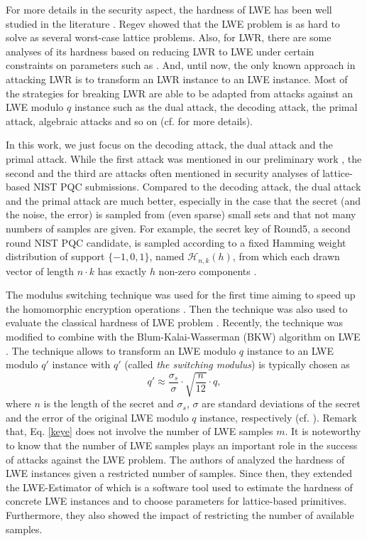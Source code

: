 \documentclass{cta-author}
\begin{document}
For more details in the security aspect, the hardness of LWE has been well studied in the literature \cite{Reg09, APS15, BLP+13}. Regev \cite{Reg09} showed that the LWE problem is as hard to solve as several worst-case lattice problems. Also, for LWR, there are some analyses of its hardness based on reducing LWR to LWE under certain constraints on parameters such as \cite{BPR12, AKPW13, BGM+15, AA16}. And, until now, the only known approach in attacking LWR is to transform an LWR instance to an LWE instance. Most of the strategies for breaking LWR are able to be adapted from attacks against an LWE modulo $q$ instance  \cite{BBGM+19, DTV15} such as the dual attack, the decoding attack, the primal attack, algebraic attacks \cite{AG11} and so on (cf. \cite{APS15} for more details). 

In this work, we just focus on the decoding attack, the dual attack and the primal attack. While the first attack was mentioned in our preliminary work \cite{LMDY18}, the second and the third are attacks often mentioned in security analyses of lattice-based NIST PQC submissions. Compared to the decoding attack, the dual attack and the primal attack are much better, especially in the case that the secret (and the noise, the error) is sampled from (even sparse) small sets and that not many numbers of samples are given. For example, the secret key of Round5, a second round NIST PQC candidate, is sampled according to a fixed Hamming weight distribution of support $\{-1, 0, 1\}$, named $\mathcal{H}_{n,k}(h)$, from which each drawn vector of length $n\cdot k$ has exactly $h$ non-zero components \cite{BBGM+19}.  


The modulus switching technique was used for the first time aiming to speed up the homomorphic encryption operations \cite{BV11a}. Then the technique was also used to evaluate the classical hardness of LWE problem \cite{BLP+13}. Recently, the technique was modified to combine with the Blum-Kalai-Wasserman (BKW) algorithm on LWE \cite{AFFP14}. The technique allows to transform an LWE modulo $q$ instance to an LWE modulo $q'$ instance  with $q'$ (called \textit{the switching modulus}) is typically chosen as
\begin{equation}\label{keye}
q' \approx \frac{\sigma_s}{\sigma}\cdot \sqrt{\frac{n}{12}}\cdot q,
\end{equation} 
where $n$ is the length of the secret and $\sigma_{s}$,  $\sigma$ are standard deviations of the secret and the error of the original LWE modulo $q$ instance, respectively (cf. \cite[Lemma 2]{APS15}).  Remark that, Eq. \eqref{keye} does not involve the number of LWE samples $m$. It is noteworthy to know that the number of LWE samples plays an important role in the success of attacks against the LWE problem. The authors of \cite{BBGS18} analyzed the hardness of LWE instances given a restricted number of samples. Since then, they extended the LWE-Estimator of \cite{APS15} which is a software tool used to estimate the hardness of concrete LWE instances and to choose parameters for lattice-based primitives. Furthermore, they also showed the impact of restricting the number of available samples. 
\end{document}
